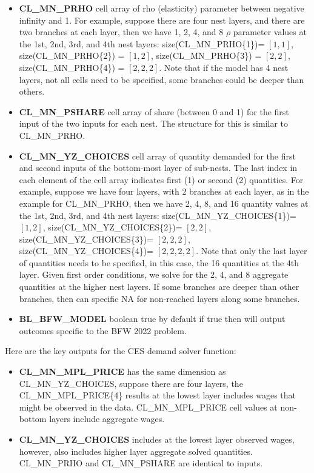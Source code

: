 \documentclass[
]{book}
\begin{document}
\begin{itemize}
\item
  \textbf{CL\_MN\_PRHO} cell array of rho (elasticity) parameter between
  negative infinity and 1. For example, suppose there are four nest
  layers, and there are two branches at each layer, then we have 1, 2,
  4, and 8 \(\rho\) parameter values at the 1st, 2nd, 3rd, and 4th nest
  layers: size(CL\_MN\_PRHO\{1\})= \(\left\lbrack 1,1\right\rbrack\),
  size(CL\_MN\_PRHO\{2\}) = \(\left\lbrack 1,2\right\rbrack\),
  size(CL\_MN\_PRHO\{3\}) = \(\left\lbrack 2,2\right\rbrack\),
  size(CL\_MN\_PRHO\{4\}) = \(\left\lbrack 2,2,2\right\rbrack\). Note that
  if the model has 4 nest layers, not all cells need to be specified,
  some branches could be deeper than others.
\item
  \textbf{CL\_MN\_PSHARE} cell array of share (between 0 and 1) for the first
  input of the two inputs for each nest. The structure for this is
  similar to CL\_MN\_PRHO.
\item
  \textbf{CL\_MN\_YZ\_CHOICES} cell array of quantity demanded for the first
  and second inputs of the bottom-most layer of sub-nests. The last
  index in each element of the cell array indicates first (1) or
  second (2) quantities. For example, suppose we have four layers,
  with 2 branches at each layer, as in the example for CL\_MN\_PRHO,
  then we have 2, 4, 8, and 16 quantity values at the 1st, 2nd, 3rd,
  and 4th nest layers: size(CL\_MN\_YZ\_CHOICES\{1\})=
  \(\left\lbrack 1,2\right\rbrack\), size(CL\_MN\_YZ\_CHOICES\{2\})=
  \(\left\lbrack 2,2\right\rbrack\), size(CL\_MN\_YZ\_CHOICES\{3\})=
  \(\left\lbrack 2,2,2\right\rbrack\), size(CL\_MN\_YZ\_CHOICES\{4\})=
  \(\left\lbrack 2,2,2,2\right\rbrack\). Note that only the last layer
  of quantities needs to be specified, in this case, the 16 quantities
  at the 4th layer. Given first order conditions, we solve for the 2,
  4, and 8 aggregate quantities at the higher nest layers. If some
  branches are deeper than other branches, then can specific NA for
  non-reached layers along some branches.
\item
  \textbf{BL\_BFW\_MODEL} boolean true by default if true then will output
  outcomes specific to the BFW 2022 problem.
\end{itemize}

Here are the key outputs for the CES demand solver function:

\begin{itemize}
\item
  \textbf{CL\_MN\_MPL\_PRICE} has the same dimension as CL\_MN\_YZ\_CHOICES,
  suppose there are four layers, the CL\_MN\_MPL\_PRICE\{4\} results at the
  lowest layer includes wages that might be observed in the data.
  CL\_MN\_MPL\_PRICE cell values at non-bottom layers include aggregate
  wages.
\item
  \textbf{CL\_MN\_YZ\_CHOICES} includes at the lowest layer observed wages,
  however, also includes higher layer aggregate solved quantities.
  CL\_MN\_PRHO and CL\_MN\_PSHARE are identical to inputs.
\end{itemize}
\end{document}
